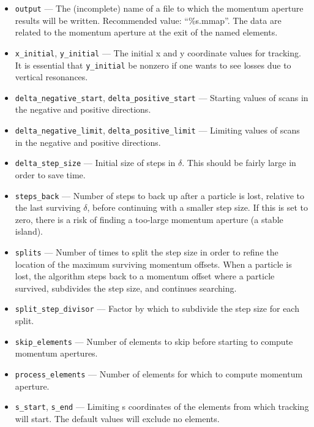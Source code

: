 \documentclass[11pt]{article}
\begin{document}
\begin{itemize}
\item \verb|output| --- The (incomplete) name of a file to which the momentum aperture results will be written.
  Recommended value: ``\%s.mmap''. The data are related to the momentum aperture at the exit of the named
  elements.
\item \verb|x_initial|, \verb|y_initial| --- The initial x and y coordinate values for tracking. It is essential
 that \verb|y_initial| be nonzero if one wants to see losses due to vertical resonances.  
\item \verb|delta_negative_start|, \verb|delta_positive_start| ---
Starting values of scans in the negative and positive
directions. 
\item \verb|delta_negative_limit|, \verb|delta_positive_limit| ---
Limiting values of scans in the negative and positive
directions. 
\item \verb|delta_step_size| --- Initial size of steps in $\delta$.  This should
 be fairly large in order to save time.

\item \verb|steps_back| --- Number of steps to back up after a particle is lost,
 relative to the last surviving $\delta$, before continuing with a smaller step size.
 If this is set to zero, there is a risk of finding a too-large momentum aperture
 (a stable island).

\item \verb|splits| --- Number of times to split the step size in
 order to refine the location of the maximum surviving momentum
 offsets.  When a particle is lost, the algorithm steps back to a momentum offset
 where a particle survived, subdivides the step size, and continues searching.  

\item \verb|split_step_divisor| --- Factor by which to subdivide the step size
  for each split.

\item \verb|skip_elements| --- Number of elements to skip before starting to
  compute momentum apertures.

\item \verb|process_elements| --- Number of elements for which to compute
  momentum aperture.

\item \verb|s_start|, \verb|s_end| --- Limiting s coordinates of the
 elements from which tracking will start.  The default values will
 exclude no elements.


\end{itemize}
\end{document}
